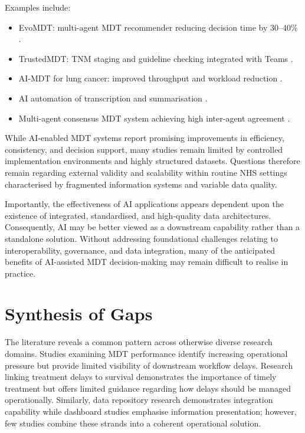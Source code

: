 Examples include:

\begin{itemize}
    \item EvoMDT: multi-agent MDT recommender reducing decision time by 30–40\% \citep{liu2026}.
    \item TrustedMDT: TNM staging and guideline checking integrated with Teams \citep{soltan2025}.
    \item AI‑MDT for lung cancer: improved throughput and workload reduction \citep{liu2026a}.
    \item AI automation of transcription and summarisation \citep{healthorbit2025}.
    \item Multi-agent consensus MDT system achieving high inter-agent agreement \citep{han2025}.
\end{itemize}

While AI-enabled MDT systems report promising improvements in efficiency, consistency, and decision support, many studies remain limited by controlled implementation environments and highly structured datasets. Questions therefore remain regarding external validity and scalability within routine NHS settings characterised by fragmented information systems and variable data quality.

Importantly, the effectiveness of AI applications appears dependent upon the existence of integrated, standardised, and high-quality data architectures. Consequently, AI may be better viewed as a downstream capability rather than a standalone solution. Without addressing foundational challenges relating to interoperability, governance, and data integration, many of the anticipated benefits of AI-assisted MDT decision-making may remain difficult to realise in practice.

\section{Synthesis of Gaps}


The literature reveals a common pattern across otherwise diverse research domains. Studies examining MDT performance identify increasing operational pressure but provide limited visibility of downstream workflow delays. Research linking treatment delays to survival demonstrates the importance of timely treatment but offers limited guidance regarding how delays should be managed operationally. Similarly, data repository research demonstrates integration capability while dashboard studies emphasise information presentation; however, few studies combine these strands into a coherent operational solution.

